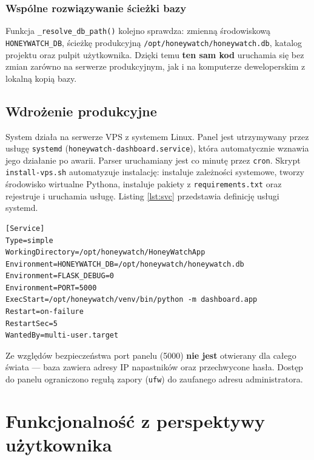 \documentclass[12pt,a4paper]{report}
\begin{document}
\subsection{Wspólne rozwiązywanie ścieżki bazy}

Funkcja \texttt{\_resolve\_db\_path()} kolejno sprawdza: zmienną środowiskową
\texttt{HONEYWATCH\_DB}, ścieżkę produkcyjną \texttt{/opt/honeywatch/honeywatch.db},
katalog projektu oraz pulpit użytkownika. Dzięki temu \textbf{ten sam kod}
uruchamia się bez zmian zarówno na serwerze produkcyjnym, jak i na komputerze
deweloperskim z lokalną kopią bazy.

\section{Wdrożenie produkcyjne}

System działa na serwerze VPS z systemem Linux. Panel jest utrzymywany przez
usługę \texttt{systemd} (\texttt{honeywatch-dashboard.service}), która
automatycznie wznawia jego działanie po awarii. Parser uruchamiany jest co
minutę przez \texttt{cron}. Skrypt \texttt{install-vps.sh} automatyzuje
instalację: instaluje zależności systemowe, tworzy środowisko wirtualne
Pythona, instaluje pakiety z \texttt{requirements.txt} oraz rejestruje
i uruchamia usługę. Listing \ref{lst:svc} przedstawia definicję usługi systemd.

\begin{lstlisting}[caption={Definicja usługi systemd panelu.},label={lst:svc}]
[Service]
Type=simple
WorkingDirectory=/opt/honeywatch/HoneyWatchApp
Environment=HONEYWATCH_DB=/opt/honeywatch/honeywatch.db
Environment=FLASK_DEBUG=0
Environment=PORT=5000
ExecStart=/opt/honeywatch/venv/bin/python -m dashboard.app
Restart=on-failure
RestartSec=5
WantedBy=multi-user.target
\end{lstlisting}

Ze względów bezpieczeństwa port panelu (5000) \textbf{nie jest} otwierany dla
całego świata --- baza zawiera adresy IP napastników oraz przechwycone hasła.
Dostęp do panelu ograniczono regułą zapory (\texttt{ufw}) do zaufanego adresu
administratora.

\chapter{Funkcjonalność z perspektywy użytkownika}
\label{ch:func}
\end{document}
